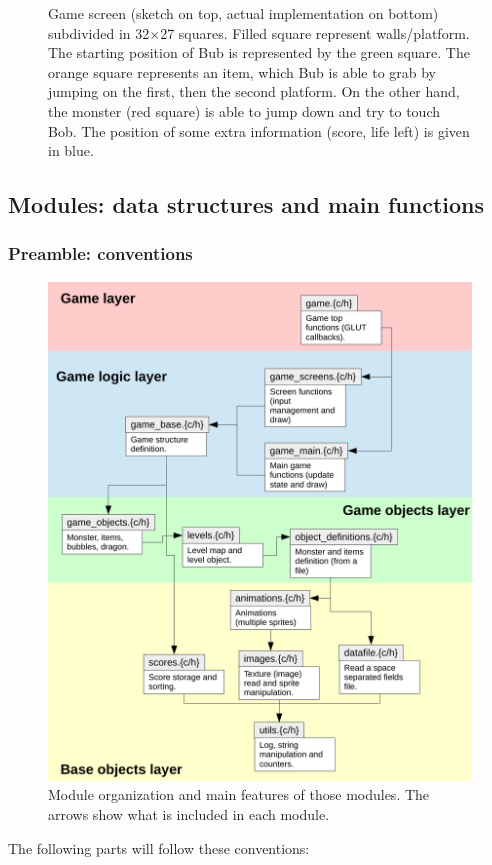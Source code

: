 \documentclass[12pt,a4paper]{article}
\begin{document}
\begin{figure}[!p]
	\caption{Game screen (sketch on top, actual implementation on bottom) subdivided in 32$\times$27 squares. Filled square represent walls/platform. The starting position of Bub is represented by the green square. The orange square represents an item, which Bub is able to grab by jumping on the first, then the second platform. On the other hand, the monster (red square) is able to jump down and try to touch Bob. The position of some extra information (score, life left) is given in blue.}
	\label{fig:4:game}
\end{figure}

\subsection{Modules: data structures and main functions}

\subsubsection{Preamble: conventions}

\begin{figure}[!p]
\centering
\includegraphics[width=.8\linewidth]{i/files}
\caption{Module organization and main features of those modules. The arrows show what is included in each module.}
\label{fig:modules}
\end{figure}

The following parts will follow these conventions:
\end{document}
